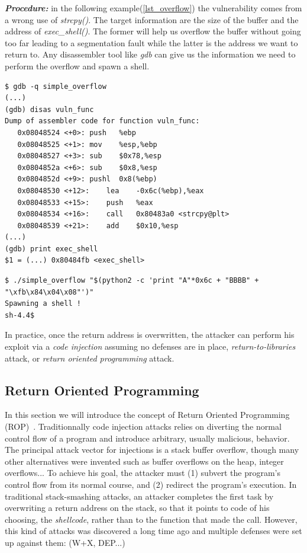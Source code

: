 \documentclass[10pt,twocolumn]{article}
\begin{document}
\textbf{\textit{Procedure:}} in the following example(\ref{lst_overflow})
the vulnerability comes from a wrong use of \textit{strcpy()}. The target
information are the size of the buffer and the address of
\textit{exec\_shell()}. The
former will help us overflow the buffer without going too far leading to a
segmentation fault while the latter is the address we want to return to. Any disassembler tool like \textit{gdb} can give us the
information we need to perform the overflow and spawn a shell.

\begin{lstlisting}[aboveskip=\bigskipamount,belowskip=\medskipamount,caption=Gdb
output on simple\_overflow.c]
$ gdb -q simple_overflow
(...)
(gdb) disas vuln_func
Dump of assembler code for function vuln_func:
   0x08048524 <+0>:	push   %ebp
   0x08048525 <+1>:	mov    %esp,%ebp
   0x08048527 <+3>:	sub    $0x78,%esp
   0x0804852a <+6>:	sub    $0x8,%esp
   0x0804852d <+9>:	pushl  0x8(%ebp)
   0x08048530 <+12>:	lea    -0x6c(%ebp),%eax
   0x08048533 <+15>:	push   %eax
   0x08048534 <+16>:	call   0x80483a0 <strcpy@plt>
   0x08048539 <+21>:	add    $0x10,%esp
(...)
(gdb) print exec_shell
$1 = (...) 0x80484fb <exec_shell>
\end{lstlisting}

\begin{lstlisting}[float=ht]
$ ./simple_overflow "$(python2 -c 'print "A"*0x6c + "BBBB" + "\xfb\x84\x04\x08"')"
Spawning a shell !
sh-4.4$
\end{lstlisting}

In practice, once the return address is overwritten, the attacker can perform his exploit via a \textit{code
injection} assuming no defenses are in place, \textit{return-to-libraries}
attack, or \textit{return oriented programming} attack.

\subsection{Return Oriented Programming}
In this section we will introduce the concept of Return Oriented Programming
(ROP)~\cite{roemer_return-oriented_2012}. Traditionnally code injection attacks
relies on diverting the normal control flow of a program and introduce
arbitrary, usually malicious, behavior. The principal attack vector for
injections is a stack buffer overflow, though many other alternatives were
invented such as buffer overflows on the heap, integer overflows... To achieve
his goal, the attacker must (1) subvert the program's control flow from its
normal course, and (2) redirect the program's execution. In traditional
stack-smashing attacks, an attacker completes the first task by overwriting a
return address on the stack, so that it points to code of his choosing, the
\textit{shellcode}, rather than to the function that made the call. However,
this kind of attacks was discovered a long time ago and multiple defenses were
set up against them: (W+X, DEP...)
\end{document}
